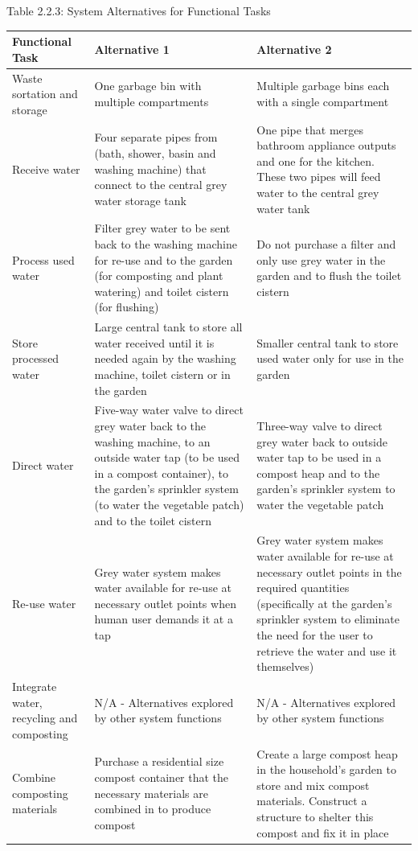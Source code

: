 \documentclass[a4paper,11pt,fleqn]{report}
\begin{document}
\begin{center}
\caption {Table 2.2.3: System Alternatives for Functional Tasks} \label{tb: FunctionalTasks} 
\begin{longtable}{p{3.5cm}|p{5.5cm}|p{5.5cm}}\toprule
	{\textbf{Functional Task}} & {\textbf{Alternative 1}} & {\textbf{Alternative 2}}\\ \midrule
    Waste sortation and storage & One garbage bin with multiple compartments & Multiple garbage bins each with a single compartment\\
    \hline
    Receive water & Four separate pipes from (bath, shower, basin and washing machine) that connect to the central grey water storage tank & One pipe that merges bathroom appliance outputs and one for the kitchen. These two pipes will feed water to the central grey water tank\\
    \hline
    Process used water & Filter grey water to be sent back to the washing machine for re-use and to the garden (for composting and plant watering) and toilet cistern (for flushing) & Do not purchase a filter and only use grey water in the garden and to flush the toilet cistern\\
    \hline
    Store processed water & Large central tank to store all water received until it is needed again by the washing machine, toilet cistern or in the garden & Smaller central tank to store used water only for use in the garden\\
    \hline
    Direct water & Five-way water valve to direct grey water back to the washing machine, to an outside water tap (to be used in a compost container), to the garden's sprinkler system (to water the vegetable patch) and to the toilet cistern & Three-way valve to direct grey water back to outside water tap to be used in a compost heap and to the garden's sprinkler system to water the vegetable patch\\
    \hline
    Re-use water & Grey water system makes water available for re-use at necessary outlet points when human user demands it at a tap & Grey water system makes water available for re-use at necessary outlet points in the required quantities (specifically at the garden's sprinkler system to eliminate the need for the user to retrieve the water and use it themselves)\\
    \hline
    Integrate water, recycling and composting & N/A - Alternatives explored by other system functions & N/A - Alternatives explored by other system functions\\
    \hline
     Combine composting materials & Purchase a residential size compost container that the necessary materials are combined in to produce compost & Create a large compost heap in the household's garden to store and mix compost materials. Construct a structure to shelter this compost and fix it in place\\

\end{longtable}
\end{center}
\end{document}

